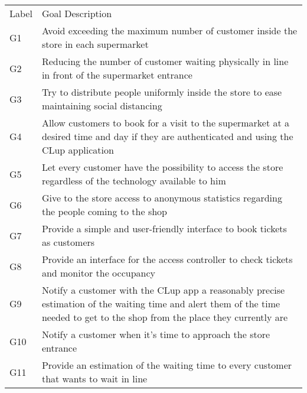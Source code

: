 \begin{tabular}{C{1cm}L{14.1cm}}
      Label & Goal Description                                                                                                                                                               \\
      G1    & Avoid exceeding the maximum number of customer inside the store in each supermarket                                                                                            \\
      G2    & Reducing the number of customer waiting physically in line in front of the supermarket entrance                                                                                \\
      G3    & Try to distribute people uniformly inside the store to ease maintaining social distancing                                                                                      \\
      G4    & Allow customers to book for a visit to the supermarket at a desired time and day if they are authenticated and using the CLup application                                      \\
      G5    & Let every customer have the possibility to access the store regardless of the technology available to him                                                                      \\
      G6    & Give to the store access to anonymous statistics regarding the people coming to the shop                                                                                       \\
      G7    & Provide a simple and user-friendly interface to book tickets as customers                                                                                                      \\
      G8    & Provide an interface for the access controller to check tickets and monitor the occupancy                                                                                      \\
      G9    & Notify a customer with the CLup app a reasonably precise estimation of the waiting time and alert them of the time needed to get to the shop from the place they currently are \\
      G10   & Notify a customer when it's time to approach the store entrance                                                                                                                \\
      G11   & Provide an estimation of the waiting time to every customer that wants to wait in line                                                                                         \\
\end{tabular}
